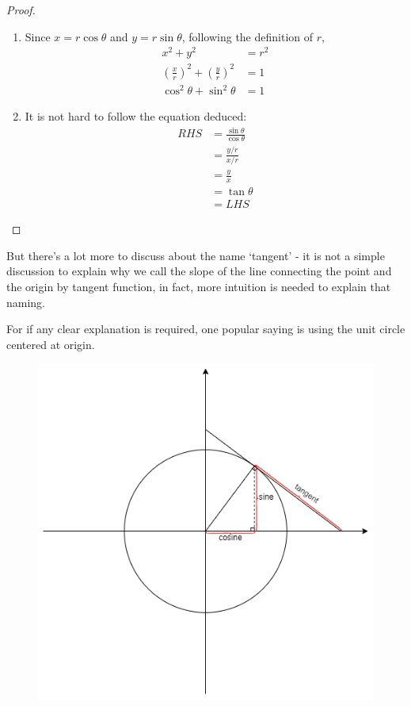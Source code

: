 \documentclass[12pt]{article}
\begin{document}
    \begin{proof}
        \begin{enumerate}
            \item Since $x=r\cos{\theta}$ and $y=r\sin{\theta}$, following the definition of $r$, \begin{align*}
                x^2+y^2&=r^2\\
                (\frac{x}{r})^2+(\frac{y}{r})^2&=1\\
                \cos^2{\theta}+\sin^2{\theta}&=1
            \end{align*}
            \item It is not hard to follow the equation deduced:\begin{align*}
                RHS&=\frac{\sin{\theta}}{\cos{\theta}}\\
                &=\frac{y/r}{x/r}\\
                &=\frac{y}{x}\\
                &=\tan{\theta}\\
                &=LHS
            \end{align*}
        \end{enumerate}
    \end{proof}

    But there's a lot more to discuss about the name `tangent' - it is not a simple discussion to explain why we call the slope of the line connecting the point and the origin by tangent function, in fact, more intuition is needed to explain that naming.

    For if any clear explanation is required, one popular saying is using the unit circle centered at origin.

    \begin{figure}[H]
        \centering
        \includegraphics[scale=0.8]{trigo_on_circle.png}
    \end{figure}
\end{document}
